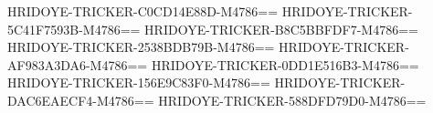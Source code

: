 HRIDOYE-TRICKER-C0CD14E88D-M4786==
HRIDOYE-TRICKER-5C41F7593B-M4786==
HRIDOYE-TRICKER-B8C5BBFDF7-M4786==
HRIDOYE-TRICKER-2538BDB79B-M4786==
HRIDOYE-TRICKER-AF983A3DA6-M4786==
HRIDOYE-TRICKER-0DD1E516B3-M4786==
HRIDOYE-TRICKER-156E9C83F0-M4786==
HRIDOYE-TRICKER-DAC6EAECF4-M4786==
HRIDOYE-TRICKER-588DFD79D0-M4786==
